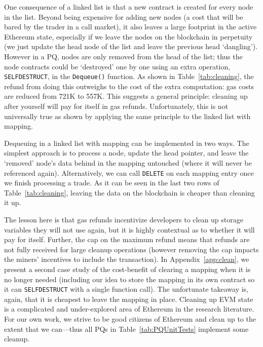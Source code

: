 One consequence of a linked list is that a new contract is created for every node in the list. Beyond being expensive for adding new nodes (a cost that will be bared by the trader in a call market), it also leaves a large footprint in the active Ethereum state, especially if we leave the nodes on the blockchain in perpetuity (\ie we just update the head node of the list and leave the previous head `dangling'). However in a PQ, nodes are only removed from the head of the list; thus the node contracts could be `destroyed' one by one using an extra operation, \texttt{SELFDESTRUCT}, in the \texttt{Dequeue()} function. As shown in Table~\ref{tab:cleaning}, the refund from doing this outweighs to the cost of the extra computation: gas costs are reduced from 721K to 557K.  This suggests a general principle: cleaning up after yourself will pay for itself in gas refunds. Unfortunately, this is not universally true as shown by applying the same principle to the linked list with mapping.

Dequeuing in a linked list with mapping can be implemented in two ways. The simplest approach is to process a node, update the head pointer, and leave the `removed' node's data behind in the mapping untouched (where it will never be referenced again). Alternatively, we can call \texttt{DELETE} on each mapping entry once we finish processing a trade. As it can be seen in the last two rows of Table~\ref{tab:cleaning}, leaving the data on the blockchain is cheaper than cleaning it up.

The lesson here is that gas refunds incentivize developers to clean up storage variables they will not use again, but it is highly contextual as to whether it will pay for itself. Further, the cap on the maximum refund means that refunds are not fully received for large cleanup operations (however removing the cap impacts the miners' incentives to include the transaction).  In Appendix~\ref{app:clean}, we present a second case study of the cost-benefit of clearing a mapping when it is no longer needed (including our idea to store the mapping in its own contract so it can \texttt{SELFDESTRUCT} with a single function call). The unfortunate takeaway is, again, that it is cheapest to leave the mapping in place. Cleaning up EVM state is a complicated and under-explored area of Ethereum in the research literature. For our own work, we strive to be good citizens of Ethereum and clean up to the extent that we can---thus all PQs in Table~\ref{tab:PQUnitTests} implement some cleanup.




